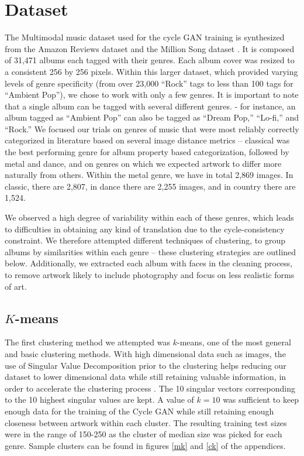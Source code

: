 \documentclass{article}
\begin{document}
\section{Dataset}

The Multimodal music dataset used for the cycle GAN training is synthesized from the Amazon Reviews dataset and the Million Song dataset \cite{Koenig}. It is composed of 31,471 albums each tagged with their genres. Each album cover was resized to a consistent 256 by 256 pixels. Within this larger dataset, which provided varying levels of genre specificity (from over 23,000 “Rock” tags to less than 100 tags for “Ambient Pop”), we chose to work with only a few genres. It is important to note that a single album can be tagged with several different genres. - for instance, an album tagged as “Ambient Pop” can also be tagged as “Dream Pop,” “Lo-fi,” and “Rock.” We focused our trials on genres of music that were most reliably correctly categorized in literature \cite{5696720} based on several image distance metrics – classical was the best performing genre for album property based categorization, followed by metal and dance, and on genres on which we expected artwork to differ more naturally from others. Within the metal genre, we have in total 2,869 images. In classic, there are 2,807, in dance there are 2,255 images, and in country there are 1,524.
\par We observed a high degree of variability within each of these genres, which leads to difficulties in obtaining any kind of translation due to the cycle-consistency constraint. We therefore attempted different techniques of clustering, to group albums by similarities within each genre – these clustering strategies are outlined below. Additionally, we extracted each album with faces in the cleaning process, to remove artwork likely to include photography and focus on less realistic forms of art.

\subsection{$K$-means}

The first clustering method we attempted was $k$-means, one of the most general and basic clustering methods. With high dimensional data such as images, the use of Singular Value Decomposition prior to the clustering helps reducing our dataset to lower dimensional data while still retaining valuable information, in order to accelerate the clustering process \cite{cite-key}. The 10 singular vectors corresponding to the 10 highest singular values are kept. A value of $k=10$ was sufficient to keep enough data for the training of the Cycle GAN while still retaining enough closeness between artwork within each cluster. The resulting training test sizes were in the range of 150-250 as the cluster of median size was picked for each genre. Sample clusters can be found in figures \ref{mk} and \ref{ck} of the appendices.
\end{document}
